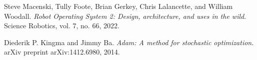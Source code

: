 \documentclass[a4paper]{article}
\begin{document}
\begin{multicols}{2}
\begin{thebibliography}{99}
Steve Macenski, Tully Foote, Brian Gerkey, Chris Lalancette, and William Woodall. 
\textit{Robot Operating System 2: Design, architecture, and uses in the wild}. 
Science Robotics, vol. 7, no. 66, 2022. 

Diederik P. Kingma and Jimmy Ba. 
\textit{Adam: A method for stochastic optimization}. 
arXiv preprint arXiv:1412.6980, 2014.

\end{thebibliography}

\end{multicols}
\end{document}
